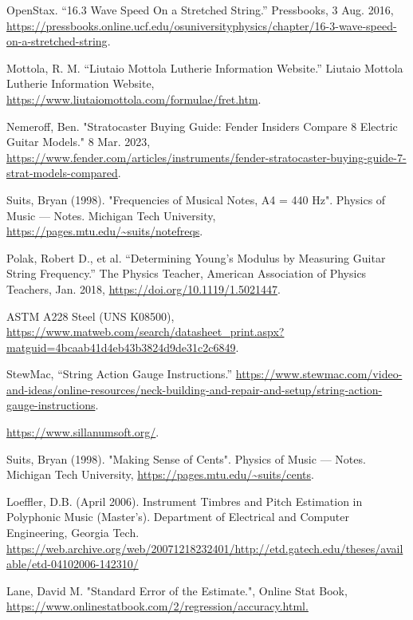 \documentclass[11pt]{article}
\begin{document}
\begin{flushleft}
\begin{thebibliography}{15}
             OpenStax. “16.3 Wave Speed On a Stretched String.” Pressbooks, 3 Aug. 2016, \url{https://pressbooks.online.ucf.edu/osuniversityphysics/chapter/16-3-wave-speed-on-a-stretched-string}.
    
             Mottola, R. M. “Liutaio Mottola Lutherie Information Website.” Liutaio Mottola Lutherie Information Website, \url{https://www.liutaiomottola.com/formulae/fret.htm}.
    
             Nemeroff, Ben. "Stratocaster Buying Guide: Fender Insiders Compare 8 Electric Guitar Models." 8 Mar. 2023, \url{https://www.fender.com/articles/instruments/fender-stratocaster-buying-guide-7-strat-models-compared}.
    
             Suits, Bryan (1998). "Frequencies of Musical Notes, A4 = 440 Hz". Physics of Music — Notes. Michigan Tech University, \url{https://pages.mtu.edu/~suits/notefreqs}.
            
             Polak, Robert D., et al. “Determining Young’s Modulus by Measuring Guitar String Frequency.” The Physics Teacher, American Association of Physics Teachers, Jan. 2018, \url{https://doi.org/10.1119/1.5021447}.
    
             ASTM A228 Steel (UNS K08500), \url{https://www.matweb.com/search/datasheet_print.aspx?matguid=4bcaab41d4eb43b3824d9de31c2c6849}.
    
             StewMac, “String Action Gauge Instructions.” \url{https://www.stewmac.com/video-and-ideas/online-resources/neck-building-and-repair-and-setup/string-action-gauge-instructions}.
    
             \url{https://www.sillanumsoft.org/}.
    
             Suits, Bryan (1998). "Making Sense of Cents". Physics of Music — Notes. Michigan Tech University, \url{https://pages.mtu.edu/~suits/cents}.
    
             Loeffler, D.B. (April 2006). Instrument Timbres and Pitch Estimation in Polyphonic Music (Master's). Department of Electrical and Computer Engineering, Georgia Tech. \url{https://web.archive.org/web/20071218232401/http://etd.gatech.edu/theses/available/etd-04102006-142310/}
    
             Lane, David M. "Standard Error of the Estimate.", Online Stat Book, \url{https://www.onlinestatbook.com/2/regression/accuracy.html.}
    
        \end{thebibliography}

    \end{flushleft}
\end{document}
